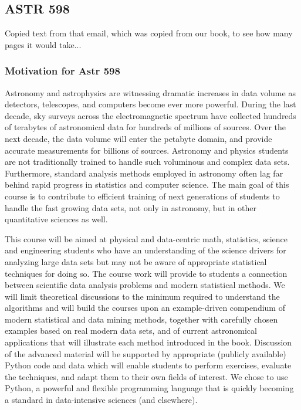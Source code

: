 


\subsection{ASTR 598} 

Copied text from that email, which was copied from our book, to see
how many pages it would take...

\subsubsection{Motivation for Astr 598}

Astronomy and astrophysics are witnessing dramatic increases in data volume 
as detectors, telescopes, and computers become ever more powerful. During the 
last decade, sky surveys across the electromagnetic spectrum have collected 
hundreds of terabytes of astronomical data for hundreds of millions of sources. 
Over the next decade, the data volume will enter the petabyte domain, and provide 
accurate measurements for billions of sources. Astronomy and physics students 
are not traditionally trained to handle such voluminous and complex data sets. 
Furthermore, standard analysis methods employed in astronomy often lag far 
behind rapid progress in statistics and computer science. The main
goal of this course is to contribute to efficient training of next
generations of students to 
handle the fast growing data sets, not only in astronomy, but in other quantitative 
sciences as well. 

This course will be aimed at physical and data-centric math,
statistics, science and engineering students
who have an understanding of the science drivers for analyzing large data sets but 
may not be aware of appropriate statistical techniques for doing so. The course work 
will provide to students a connection between scientific data analysis problems and 
modern statistical methods. We will limit theoretical discussions to the minimum 
required to understand the algorithms and will build the courses upon an 
example-driven compendium of modern statistical and data mining methods, 
together with carefully chosen examples based on real modern data sets, and of 
current astronomical applications that will illustrate each method introduced in the 
book. Discussion of the advanced material will be supported by appropriate (publicly 
available) Python code and data which will enable students to perform exercises, 
evaluate the techniques, and adapt them to their own fields of interest. We chose to 
use Python, a powerful and flexible programming language that is quickly becoming 
a standard in data-intensive sciences (and elsewhere). 

